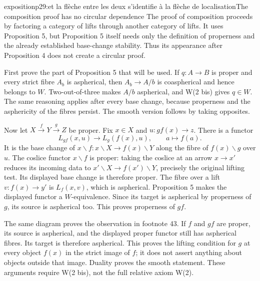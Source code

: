 \begin{dcomment}{exposition}{p29:et la flèche entre les deux s'identifie à la flèche de localisation}{The composition proof has no circular dependence}
The proof of composition proceeds by factoring a category of lifts through another category of lifts. It uses Proposition 5, but Proposition 5 itself needs only the definition of properness and the already established base-change stability. Thus its appearance after Proposition 4 does not create a circular proof.

First prove the part of Proposition 5 that will be used. If $q:A\to B$ is proper and every strict fibre $A_b$ is aspherical, then $A_b\to A/b$ is coaspherical and hence belongs to $W$. Two-out-of-three makes $A/b$ aspherical, and W(2 bis) gives $q\in W$. The same reasoning applies after every base change, because properness and the asphericity of the fibres persist. The smooth version follows by taking opposites.

Now let $X\xrightarrow fY\xrightarrow gZ$ be proper. Fix $x\in X$ and $u:gf(x)\to z$. There is a functor
\[
 L_{gf}(x,u)\longrightarrow L_g(f(x),u),\qquad a\longmapsto f(a).
\]
It is the base change of $x\backslash f:x\backslash X\to f(x)\backslash Y$ along the fibre of $f(x)\backslash g$ over $u$. The coslice functor $x\backslash f$ is proper: taking the coslice at an arrow $x\to x'$ reduces its incoming data to $x'\backslash X\to f(x')\backslash Y$, precisely the original lifting test. Its displayed base change is therefore proper. The fibre over a lift $v:f(x)\to y'$ is $L_f(x,v)$, which is aspherical. Proposition 5 makes the displayed functor a $W$-equivalence. Since its target is aspherical by properness of $g$, its source is aspherical too. This proves properness of $gf$.

The same diagram proves the observation in footnote 43. If $f$ and $gf$ are proper, its source is aspherical, and the displayed proper functor still has aspherical fibres. Its target is therefore aspherical. This proves the lifting condition for $g$ at every object $f(x)$ in the strict image of $f$; it does not assert anything about objects outside that image. Duality proves the smooth statement. These arguments require W(2 bis), not the full relative axiom W(2).
\end{dcomment}

